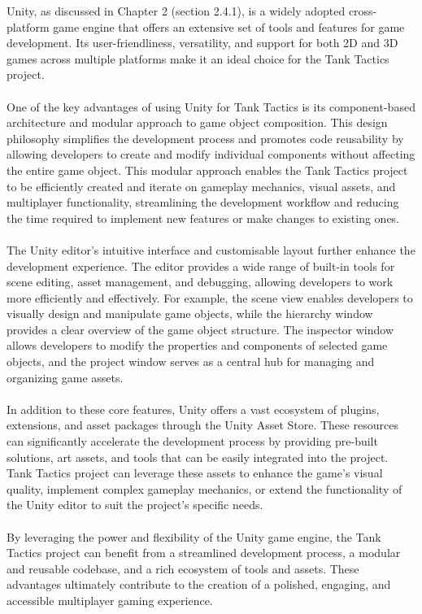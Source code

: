 Unity, as discussed in Chapter 2 (section 2.4.1), is a widely adopted cross-platform game engine that offers an extensive set of tools and features for game development. Its user-friendliness, versatility, and support for both 2D and 3D games across multiple platforms make it an ideal choice for the Tank Tactics project.
\\
\noindent
\\
One of the key advantages of using Unity for Tank Tactics is its component-based architecture and modular approach to game object composition. This design philosophy simplifies the development process and promotes code reusability by allowing developers to create and modify individual components without affecting the entire game object. This modular approach enables the Tank Tactics project to be efficiently created and iterate on gameplay mechanics, visual assets, and multiplayer functionality, streamlining the development workflow and reducing the time required to implement new features or make changes to existing ones.
\\
\noindent
\\
The Unity editor's intuitive interface and customisable layout further enhance the development experience. The editor provides a wide range of built-in tools for scene editing, asset management, and debugging, allowing developers to work more efficiently and effectively. For example, the scene view enables developers to visually design and manipulate game objects, while the hierarchy window provides a clear overview of the game object structure. The inspector window allows developers to modify the properties and components of selected game objects, and the project window serves as a central hub for managing and organizing game assets.
\\
\noindent
\\
In addition to these core features, Unity offers a vast ecosystem of plugins, extensions, and asset packages through the Unity Asset Store. These resources can significantly accelerate the development process by providing pre-built solutions, art assets, and tools that can be easily integrated into the project. Tank Tactics project can leverage these assets to enhance the game's visual quality, implement complex gameplay mechanics, or extend the functionality of the Unity editor to suit the project's specific needs.
\\
\noindent
\\
By leveraging the power and flexibility of the Unity game engine, the Tank Tactics project can benefit from a streamlined development process, a modular and reusable codebase, and a rich ecosystem of tools and assets. These advantages ultimately contribute to the creation of a polished, engaging, and accessible multiplayer gaming experience.

